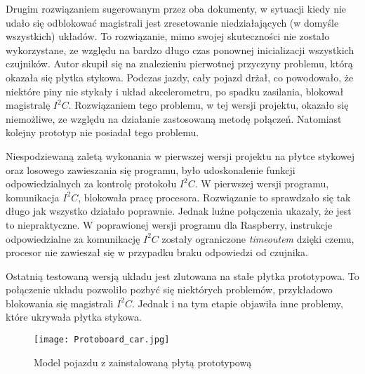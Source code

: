         Drugim rozwiązaniem sugerowanym przez oba dokumenty, w sytuacji kiedy nie udało się odblokować magistrali jest zresetowanie niedziałających (w domyśle wszystkich) układów.
        To rozwiązanie, mimo swojej skuteczności nie zostało wykorzystane, ze względu na bardzo długo czas ponownej inicializacji wszystkich czujników.
        Autor skupił się na znalezieniu pierwotnej przyczyny problemu, którą okazała się płytka stykowa.
        Podczas jazdy, cały pojazd drżał, co powodowało, że niektóre piny nie stykały i układ akcelerometru, po spadku zasilania, blokował magistralę $I^2C$.
        Rozwiązaniem tego problemu, w tej wersji projektu, okazało się niemożliwe, ze względu na działanie zastosowaną metodę połączeń.
        Natomiast kolejny prototyp nie posiadał tego problemu.

        Niespodziewaną zaletą wykonania w pierwszej wersji projektu na płytce stykowej oraz losowego zawieszania się programu, było udoskonalenie funkcji odpowiedzialnych za kontrolę protokołu $I^2C$.
        W pierwszej wersji programu, komunikacja $I^2C$, blokowała pracę procesora.
        Rozwiązanie to sprawdzało się tak długo jak wszystko działało poprawnie.
        Jednak luźne połączenia ukazały, że jest to niepraktyczne.
        W poprawionej wersji programu dla Raspberry, instrukcje odpowiedzialne za komunikację $I^2C$ zostały ograniczone \textit{timeoutem} dzięki czemu, procesor nie zawieszał się w przypadku braku odpowiedzi od czujnika.

        Ostatnią testowaną wersją układu jest zlutowana na stałe płytka prototypowa.
        To połączenie układu pozwoliło pozbyć się niektórych problemów, przykładowo blokowania się magistrali $I^2C$.
        Jednak i na tym etapie objawiła inne problemy, które ukrywała płytka stykowa.
        \begin{figure}[!ht]
            \centering
            \texttt{[image: Protoboard\_car.jpg]}
            \caption{Model pojazdu z zainstalowaną płytą prototypową}
            \label{fig:protoboard_car}
        \end{figure}

